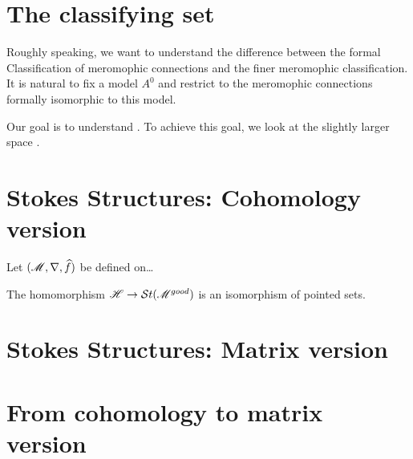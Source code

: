\section{The classifying set}
\begin{comment}
  \begin{itemize}
    \item \cite{thboalch} p.6
      \begin{itemize}
        \item \cite{boalch} p.19
      \end{itemize}
    \item \cite{Loday1994} p.852
    \item \cite{sabbah2007isomonodromic} p.111
  \end{itemize}
\end{comment}
Roughly speaking, we want to understand the difference between the formal
Classification of meromophic connections and the finer meromophic
classification.
It is natural to fix a model $A^0$ and restrict to the meromophic connections
formally isomorphic to this model.


Our goal is to understand \TODO.
To achieve this goal, we look at the slightly larger space \TODO.

\TODO[Define $\sH$]
\begin{comment} \footnotesize
  \begin{lem}
    The presheaf $\sH$ is a sheaf on $\{0\}$.
  \end{lem}
  \begin{proof}
    See \cite{sabbah2007isomonodromic} lemma II.6.2. 
  \end{proof}
\end{comment}

\begin{comment}
  \TODO: left quotient? $G\backslash\hat G(A_0)$
\end{comment}
\section{Stokes Structures: Cohomology version}
Let $(\mathscr{M},\nabla,\widehat f)$ be defined on\dots

\begin{thm}
  The homomorphism $\mathscr{H}\to\mathcal{S}{}t(\mathscr{M}^{good})$ is an isomorphism of pointed sets.
\end{thm}
\section{Stokes Structures: Matrix version}
\section{From cohomology to matrix version}
